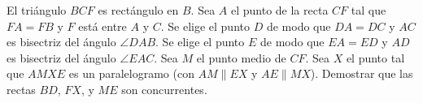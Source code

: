 El triángulo $BCF$ es rectángulo en $B$. Sea $A$ el punto de la recta $CF$ tal que $FA = FB$ y $F$ está entre $A$ y $C$. Se elige el punto $D$ de modo que $DA = DC$ y $AC$ es bisectriz del ángulo $\angle DAB$. Se elige el punto $E$ de modo que $EA = ED$ y $AD$ es bisectriz del ángulo $\angle EAC$. Sea $M$ el punto medio de $CF$. Sea $X$ el punto tal que $AMXE$ es un paralelogramo (con $AM \parallel EX$ y $AE \parallel MX$). Demostrar que las rectas $BD$, $FX$, y $ME$ son concurrentes.
